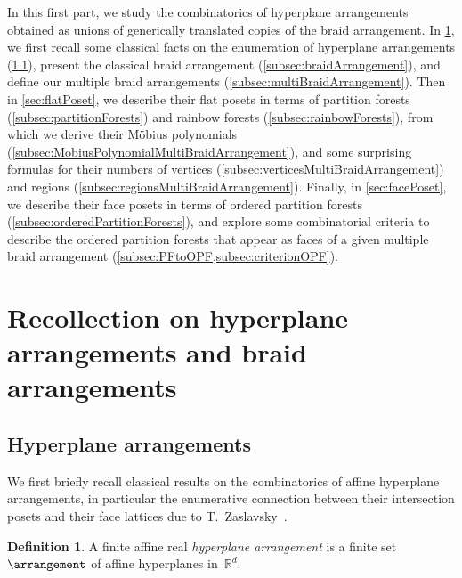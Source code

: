 \documentclass{amsart}
\newcommand{\darkblue}{\color{darkblue}} %
\theoremstyle{definition}
\newtheorem{definition}[theorem]{Definition}
\newcommand{\R}{\mathbb{R}} %
\newcommand{\defn}[1]{\textsl{\darkblue #1}} %
\begin{document}
In this first part, we study the combinatorics of hyperplane arrangements obtained as unions of generically translated copies of the braid arrangement.
In \cref{sec:arrangements}, we first recall some classical facts on the enumeration of hyperplane arrangements (\cref{subsec:arrangements}), present the classical braid arrangement (\cref{subsec:braidArrangement}), and define our multiple braid arrangements (\cref{subsec:multiBraidArrangement}).
Then in \cref{sec:flatPoset}, we describe their flat posets in terms of partition forests (\cref{subsec:partitionForests}) and rainbow forests (\cref{subsec:rainbowForests}), from which we derive their M\"obius polynomials (\cref{subsec:MobiusPolynomialMultiBraidArrangement}), and some surprising formulas for their numbers of vertices (\cref{subsec:verticesMultiBraidArrangement}) and regions (\cref{subsec:regionsMultiBraidArrangement}).
Finally, in \cref{sec:facePoset}, we describe their face posets in terms of ordered partition forests (\cref{subsec:orderedPartitionForests}), and explore some combinatorial criteria to describe the ordered partition forests that appear as faces of a given multiple braid arrangement (\cref{subsec:PFtoOPF,subsec:criterionOPF}).


\section{Recollection on hyperplane arrangements and braid arrangements}
\label{sec:arrangements}


\subsection{Hyperplane arrangements}
\label{subsec:arrangements}

We first briefly recall classical results on the combinatorics of affine hyperplane arrangements, in particular the enumerative connection between their intersection posets and their face lattices due to T.~Zaslavsky~\cite{Zaslavsky}.

\begin{definition}
A finite affine real \defn{hyperplane arrangement} is a finite set~$\arrangement$ of affine hyperplanes in~$\R^d$.
\end{definition}
\end{document}
